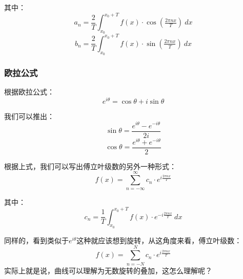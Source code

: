 \documentclass[12pt]{article}
\begin{document}
其中：
$$
a_{n}={\frac  {2}{T}}\int _{{x_{0}}}^{{x_{0}+T}}f(x)\cdot \cos({\tfrac  {2\pi nx}{T}})\ dx
$$
$$
b_{n}={\frac  {2}{T}}\int _{{x_{0}}}^{{x_{0}+T}}f(x)\cdot \sin({\tfrac  {2\pi nx}{T}})\ dx
$$

\subsubsection{欧拉公式}
根据欧拉公式：
$$
e^{i\theta } = \cos \theta +i\sin \theta 
$$

我们可以推出：
$$
    \sin \theta ={\frac{e^{{i\theta }}-e^{{-i\theta }}}{2i}} 
$$
$$
    \cos \theta ={\frac{e^{{i\theta }}+e^{{-i\theta }}}{2}}
$$

根据上式，我们可以写出傅立叶级数的另外一种形式：
$$
f(x)=\sum _{{n=-\infty}}^{\infty}c_{n}\cdot e^{{i{\tfrac  {2\pi nx}{T}}}}
$$

其中：
$$
c_{n}={\frac{1}{T}}\int _{{x_{0}}}^{{x_{0}+T}}f(x)\cdot e^{{-i{\tfrac  {2\pi nx}{T}}}}\ dx
$$

同样的，看到类似于$e^{i\theta}$这种就应该想到旋转，从这角度来看，傅立叶级数：
$$
f(x)=\sum _{{n=-N}}^{N}c_{n}\cdot e^{{i{\tfrac  {2\pi nx}{T}}}}
$$
实际上就是说，曲线可以理解为无数旋转的叠加，这怎么理解呢？
\end{document}
